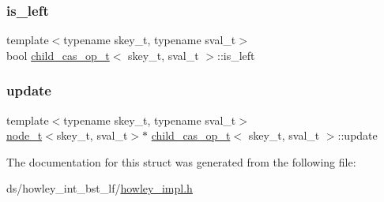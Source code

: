 \subsubsection{\texorpdfstring{is\+\_\+left}{is\_left}}
{\footnotesize\ttfamily template$<$typename skey\+\_\+t, typename sval\+\_\+t$>$ \\
bool \hyperlink{structchild__cas__op__t}{child\+\_\+cas\+\_\+op\+\_\+t}$<$ skey\+\_\+t, sval\+\_\+t $>$\+::is\+\_\+left}

\mbox{\label{structchild__cas__op__t_a5e4b9e71b9c923eb44db92dd1fb799c8}} 
\subsubsection{\texorpdfstring{update}{update}}
{\footnotesize\ttfamily template$<$typename skey\+\_\+t, typename sval\+\_\+t$>$ \\
\hyperlink{structnode__t}{node\+\_\+t}$<$skey\+\_\+t, sval\+\_\+t$>$$\ast$ \hyperlink{structchild__cas__op__t}{child\+\_\+cas\+\_\+op\+\_\+t}$<$ skey\+\_\+t, sval\+\_\+t $>$\+::update}



The documentation for this struct was generated from the following file\+:\begin{DoxyCompactItemize}
\item 
ds/howley\+\_\+int\+\_\+bst\+\_\+lf/\hyperlink{howley__impl_8h}{howley\+\_\+impl.\+h}\end{DoxyCompactItemize}
